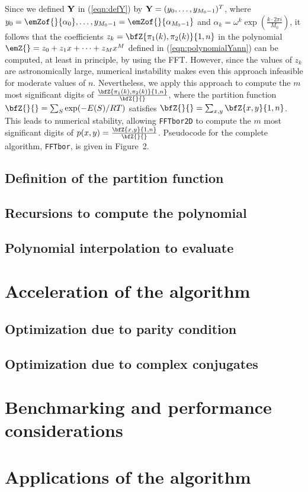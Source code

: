 Since we defined $\bf Y$ in (\ref{eqn:defY}) by ${\bf Y} =
(y_0,\ldots,y_{M_0-1})^T$, where
$y_0=\emZof{}{\alpha_0},\ldots, y_{M_0-1}=\emZof{}{\alpha_{M_0-1}}$ and $\alpha_k = \omega^k
\exp(\frac{k \cdot 2\pi i}{M_0})$,
it follows that the coefficients
$z_k=\bfZ{\pi_1(k),\pi_2(k)}{1,n}$ in the polynomial
$\emZ{} = z_0 + z_1 x + \cdots + z_{M} x^{M}$ defined in
(\ref{eqn:polynomialYann}) can be computed, at least in principle,
by using the FFT. However, since the values of
$z_{k}$ are astronomically large, numerical
instability makes even this approach infeasible for moderate values of $n$.
Nevertheless, we apply this approach to compute the $m$ most significant
digits of $\frac{\bfZ{\pi_1(k),\pi_2(k)}{1,n}}{\bfZ{}{}}$,
where the partition function $\bfZ{}{} = \sum_{S} \exp(-E(S)/RT)$ satisfies
${\bfZ{}{}} = \sum_{x,y} \bfZ{x,y}{1,n}$. This leads to numerical stability,
allowing {\tt FFTbor2D} to compute the
$m$ most significant digits of $p(x,y) = \frac{\bfZ{x,y}{1,n}}{\bfZ{}{}}$.
Pseudocode for the complete algorithm, {\tt FFTbor}, is given in
Figure~2.

\subsection{Definition of the partition function
\texorpdfstring{}{}}
\label{subsec:ffttwo:recursions}

\subsection{Recursions to compute the polynomial
\texorpdfstring{}{}}
\label{subsec:ffttwo:polynomial}

\subsection{Polynomial interpolation to evaluate
\texorpdfstring{}{}}
\label{subsec:ffttwo:fft}

\section{Acceleration of the \ffttwo algorithm}
\label{sec:ffttwo:perf}

\subsection{Optimization due to parity condition}
\label{subsec:ffttwo:parity}

\subsection{Optimization due to complex conjugates}
\label{subsec:ffttwo:compconj}

\section{Benchmarking and performance considerations}
\label{sec:ffttwo:benchmarking}

\section{Applications of the \ffttwo algorithm}
\label{sec:ffttwo:applications}
